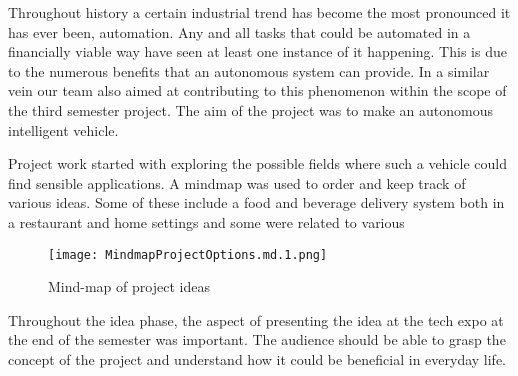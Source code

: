 \documentclass[../report.tex]{subfiles}
\begin{document}
    Throughout history a certain industrial trend has become the most pronounced 
    it has ever been, automation. Any and all tasks that could be automated in a
    financially viable way have seen at least one instance of it happening. This
    is due to the numerous benefits that an autonomous system can provide. In a
    similar vein our team also aimed at contributing to this phenomenon within 
    the scope of the third semester project. The aim of the project was to make
    an autonomous intelligent vehicle.

    Project work started with exploring the possible fields where such a vehicle
    could find sensible applications. A mindmap was used to order and keep track
    of various ideas. Some of these include a food and beverage delivery system
    both in a restaurant and home settings and some were related to various 

    \begin{figure}[H]
        \centering
        \texttt{[image: MindmapProjectOptions.md.1.png]}
        \caption{Mind-map of project ideas}
    \end{figure}   

    Throughout the idea phase, the aspect of presenting the idea at the tech
    expo at the end of the semester was important. The audience should be able
    to grasp the concept of the project and understand how it could be
    beneficial in everyday life.
\end{document}
